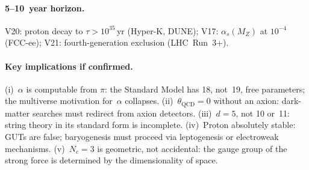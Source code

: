 \paragraph{5--10~year horizon.}
V20: proton decay to $\tau>10^{35}\,$yr (Hyper-K, DUNE);
V17: $\alpha_s(M_Z)$ at $10^{-4}$ (FCC-ee);
V21: fourth-generation exclusion (LHC~Run~3+).

\paragraph{Key implications if confirmed.}
(i)~$\alpha$ is computable from $\pi$: the Standard Model has 18, not~19,
free parameters; the multiverse motivation for~$\alpha$ collapses.
(ii)~$\theta_{\mathrm{QCD}}=0$ without an axion: dark-matter searches
must redirect from axion detectors.
(iii)~$d=5$, not 10 or~11: string theory in its standard form is incomplete.
(iv)~Proton absolutely stable: GUTs are false; baryogenesis must proceed
via leptogenesis or electroweak mechanisms.
(v)~$N_c=3$ is geometric, not accidental: the gauge group of the strong
force is determined by the dimensionality of space.
